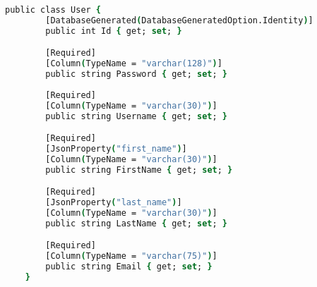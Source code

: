 \begin{lstlisting}[language=csh,caption={ASP.NET Core user model},breaklines=true,label={lst:aspnetModel}]
    public class User {
        [DatabaseGenerated(DatabaseGeneratedOption.Identity)]
        public int Id { get; set; }

        [Required]
        [Column(TypeName = "varchar(128)")]
        public string Password { get; set; }
        
        [Required]
        [Column(TypeName = "varchar(30)")]
        public string Username { get; set; }

        [Required]
        [JsonProperty("first_name")]
        [Column(TypeName = "varchar(30)")]
        public string FirstName { get; set; }

        [Required]
        [JsonProperty("last_name")]
        [Column(TypeName = "varchar(30)")]
        public string LastName { get; set; }

        [Required]
        [Column(TypeName = "varchar(75)")]
        public string Email { get; set; }
    }
\end{lstlisting}
